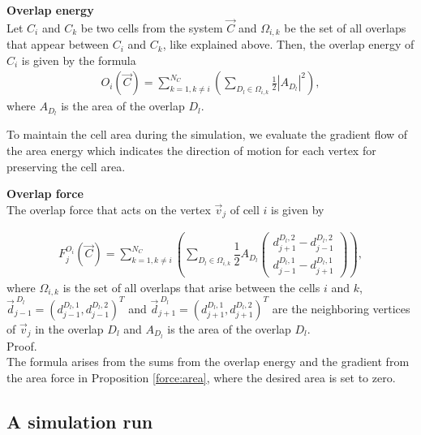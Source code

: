 \begin{definition} \textbf{Overlap energy} \\
	Let $C_i$ and $C_k$ be two cells from the system $\vec{C}$ and $\Omega_{i,k}$ be the set of all overlaps that appear between $C_i$ and $C_k$, like explained above. Then, the overlap energy of $C_i$ is given by the formula 
	\begin{align}
		O_i(\vec{C}) = \sum\limits_{k=1, k \neq i}^{N_C} (\sum\limits_{D_l \in \Omega_{i,k}} \frac{1}{2}|A_{D_l}|^2),		
	\end{align} 
	where $A_{D_l}$ is the area of the overlap $D_l$.  \\
\end{definition}

To maintain the cell area during the simulation, we evaluate the gradient flow of the area energy which indicates the direction of motion for each vertex for preserving the cell area.

\begin{proposition} \textbf{Overlap force} \\
	The overlap force that acts on the vertex $\vec{v}_j$ of cell $i$ is given by 

	\begin{align}
		F_j^{O_i}(\vec{C}) = \sum\limits_{k=1, k \neq i}^{N_C} \left( \sum\limits_{D_l \in \Omega_{i,k}} \dfrac{1}{2} A_{D_l} \begin{pmatrix} d_{j+1}^{D_l, 2} - d_{j-1}^{D_l, 2} \\[0.5em]  d_{j-1}^{D_l, 1} - d_{j+1}^{D_l, 1} \end{pmatrix} \right),
	\end{align}
	where $\Omega_{i,k}$ is the set of all overlaps that arise between the cells $i$ and $k$, $\vec{d}_{j-1}^{\: D_l} = (d_{j-1}^{D_l, 1}, d_{j-1}^{D_l, 2})^T$ and $\vec{d}_{j+1}^{\: D_l} = (d_{j+1}^{D_l, 1}, d_{j+1}^{D_l, 2})^T$ are the neighboring vertices of $\vec{v}_j$ in the overlap $D_l$ and $A_{D_l}$ is the area of the overlap $D_l$. \\

	Proof. \\
	The formula arises from the sums from the overlap energy and the gradient from the area force in Proposition \ref{force:area}, where the desired area is set to zero. 
\end{proposition}


\subsection{A simulation run}
